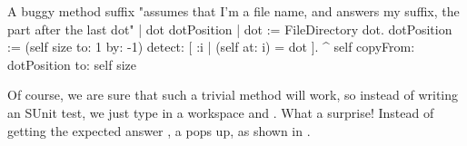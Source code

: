 \documentclass[a4paper,10pt,twoside]{book}
\begin{document}

\needspace{10ex}
\begin{method}[buggy]{A buggy method}
suffix
	"assumes that I'm a file name, and answers my suffix, the part after the last dot"
	| dot dotPosition |
	dot := FileDirectory dot.
	dotPosition := (self size to: 1 by: -1) detect: [ :i | (self at: i) = dot ].
	^ self copyFrom: dotPosition to: self size 
\end{method}

Of course, we are sure that such a trivial method will work, so instead of writing an SUnit test, we just type
 in a workspace and .
What a surprise!  Instead of getting the expected answer , a  pops up, as shown in .
\end{document}
